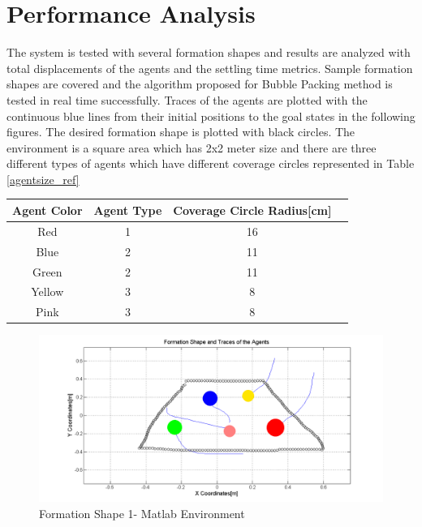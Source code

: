 \section{Performance Analysis}
The system is tested with several formation shapes and results are analyzed with total displacements of the agents and the settling time metrics. Sample formation shapes are covered  and the algorithm proposed for Bubble Packing method is tested in real time successfully.  Traces of the agents are plotted with the continuous blue lines from their initial positions to the goal states in the following figures. The desired formation shape is plotted with black circles. The environment is a square area which has 2x2 meter size and there are three different types of agents which have different coverage circles represented in Table \ref{agentsize_ref}

\begin{center}
 \label{agentsize_ref} 
\begin{tabular}{|c| c |c |c ||}
\hline
\textbf{Agent Color}  & \textbf{Agent Type} & \textbf{Coverage Circle Radius[cm]}\\ 
\hline
Red & 1 & 16 \\
Blue & 2 & 11 \\
Green & 2 & 11 \\
Yellow & 3 & 8 \\
Pink & 3 & 8 \\
\hline
\end{tabular}
\end{center}
		
\begin{figure}[H]
\caption{Formation Shape 1- Matlab Environment}
\centerline{\includegraphics[scale = 0.45]{2_hardware}}
\end{figure} 
			
